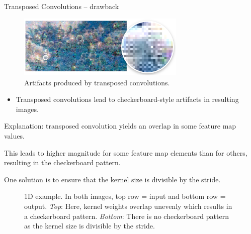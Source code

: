 \begin{vbframe}{Transposed Convolutions -- drawback}
    \begin{figure}
        \centering
        \includegraphics[width=8cm]{plots/05_conv_variations/transpose/transpose_artifact.png}
        \caption{Artifacts produced by transposed convolutions.}
    \end{figure}
    \begin{itemize}
        \item Transposed convolutions lead to checkerboard-style artifacts in resulting images.
    \end{itemize}
    
\framebreak

\begin{itemize}
        \small{\item Explanation: transposed convolution yields an overlap in some feature map values.
        \item This leads to higher magnitude for some feature map elements than for others, resulting in the checkerboard pattern.
        \item One solution is to ensure that the kernel size is divisible by the stride.
        }
    \end{itemize}
        \begin{figure}
            \centering
            \caption{\footnotesize{1D example. In both images, top row = input and bottom row = output. \textit{Top}: Here, kernel weights overlap unevenly which results in a checkerboard pattern. \textit{Bottom}: There is no checkerboard pattern as the kernel size is divisible by the stride.}}
        \end{figure}
       

\end{vbframe}
